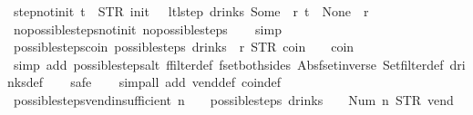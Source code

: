 \begin{isabellebody}
\endisatagproof
{\isafoldproof}%
%
\isadelimproof
\isanewline
%
\endisadelimproof
\isanewline
{}\isamarkupfalse%
\ step{\isacharunderscore}not{\isacharunderscore}init{\isacharcolon}\ {\isachardoublequoteopen}t\ {\isasymnoteq}\ {\isacharparenleft}STR\ {\isacharprime}{\isacharprime}init{\isacharprime}{\isacharprime}{\isacharcomma}\ {\isacharbrackleft}{\isacharbrackright}{\isacharparenright}\ {\isasymLongrightarrow}\ ltl{\isacharunderscore}step\ drinks\ {\isacharparenleft}Some\ {}{\isacharparenright}\ r\ t\ {\isacharequal}\ {\isacharparenleft}None{\isacharcomma}\ {\isacharbrackleft}{\isacharbrackright}{\isacharcomma}\ r{\isacharparenright}{\isachardoublequoteclose}\isanewline
%
\isadelimproof
\ \ %
\endisadelimproof
%
\isatagproof
{}\isamarkupfalse%
\ no{\isacharunderscore}possible{\isacharunderscore}steps{\isacharunderscore}not{\isacharunderscore}init\ no{\isacharunderscore}possible{\isacharunderscore}steps\isanewline
\ \ \isamarkupfalse%
\ simp%
\endisatagproof
{\isafoldproof}%
%
\isadelimproof
\isanewline
%
\endisadelimproof
\isanewline
{}\isamarkupfalse%
\ possible{\isacharunderscore}steps{\isacharunderscore}coin{\isacharcolon}\ {\isachardoublequoteopen}possible{\isacharunderscore}steps\ drinks\ {}\ r\ STR\ {\isacharprime}{\isacharprime}coin{\isacharprime}{\isacharprime}\ {\isacharbrackleft}{\isacharbrackright}\ {\isacharequal}\ {\isacharbraceleft}{\isacharbar}{\isacharparenleft}{}{\isacharcomma}\ coin{\isacharparenright}{\isacharbar}{\isacharbraceright}{\isachardoublequoteclose}\isanewline
%
\isadelimproof
\ \ %
\endisadelimproof
%
\isatagproof
{}\isamarkupfalse%
\ {\isacharparenleft}simp\ add{\isacharcolon}\ possible{\isacharunderscore}steps{\isacharunderscore}alt\ ffilter{\isacharunderscore}def\ fset{\isacharunderscore}both{\isacharunderscore}sides\ Abs{\isacharunderscore}fset{\isacharunderscore}inverse\ Set{\isachardot}filter{\isacharunderscore}def\ drinks{\isacharunderscore}def{\isacharparenright}\isanewline
\ \ \isamarkupfalse%
\ safe\isanewline
\ \ \isamarkupfalse%
\ {\isacharparenleft}simp{\isacharunderscore}all\ add{\isacharcolon}\ vend{\isacharunderscore}def\ coin{\isacharunderscore}def{\isacharparenright}%
\endisatagproof
{\isafoldproof}%
%
\isadelimproof
\isanewline
%
\endisadelimproof
\isanewline
{}\isamarkupfalse%
\ possible{\isacharunderscore}steps{\isacharunderscore}vend{\isacharunderscore}insufficient{\isacharcolon}\ {\isachardoublequoteopen}n\ {\isasymle}\ {}\ {\isasymLongrightarrow}\ possible{\isacharunderscore}steps\ drinks\ {}\ {\isacharless}{}\ {\isacharcolon}{\isacharequal}\ Num\ n{\isachargreater}\ STR\ {\isacharprime}{\isacharprime}vend{\isacharprime}{\isacharprime}\ {\isacharbrackleft}{\isacharbrackright}\ {\isacharequal}\ {\isacharbraceleft}{\isacharbar}{\isacharbar}{\isacharbraceright}{\isachardoublequoteclose}\isanewline

\end{isabellebody}
